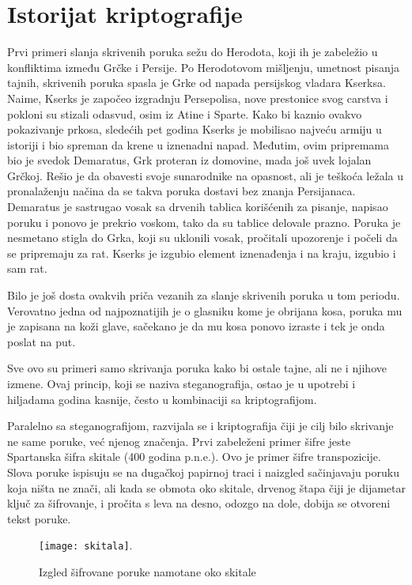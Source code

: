 \documentclass[a4paper]{article}
\begin{document}
\section{Istorijat kriptografije}
\label{sec:istorijat_kriptografije}
Prvi primeri slanja skrivenih poruka sežu do Herodota, koji ih je zabeležio u konfliktima između Grčke i Persije. Po Herodotovom mišljenju, umetnost pisanja tajnih, skrivenih poruka spasla je Grke od napada persijskog vladara Kserksa. Naime, Kserks je započeo izgradnju Persepolisa, nove prestonice svog carstva i pokloni su stizali odasvud, osim iz Atine i Sparte. Kako bi kaznio ovakvo pokazivanje prkosa, sledećih pet godina Kserks je mobilisao najveću armiju u istoriji i bio spreman da krene u iznenadni napad. Međutim, ovim pripremama bio je svedok Demaratus, Grk proteran iz domovine, mada još uvek lojalan Grčkoj. Rešio je da obavesti svoje sunarodnike na opasnost, ali je teškoća ležala u pronalaženju načina da se takva poruka dostavi bez znanja Persijanaca. Demaratus je sastrugao vosak sa drvenih tablica korišćenih za pisanje, napisao poruku i ponovo je prekrio voskom, tako da su tablice delovale prazno. Poruka je nesmetano stigla do Grka, koji su uklonili vosak, pročitali upozorenje i počeli da se pripremaju za rat. Kserks je izgubio element iznenađenja i na kraju, izgubio i sam rat.

Bilo je još dosta ovakvih priča vezanih za slanje skrivenih poruka u tom periodu. Verovatno jedna od najpoznatijih je o glasniku kome je obrijana kosa, poruka mu je zapisana na koži glave, sačekano je da mu kosa ponovo izraste i tek je onda poslat na put.

Sve ovo su primeri samo skrivanja poruka kako bi ostale tajne, ali ne i njihove izmene. Ovaj princip, koji se naziva steganografija, ostao je u upotrebi i hiljadama godina kasnije, često u kombinaciji sa kriptografijom.

Paralelno sa steganografijom, razvijala se i kriptografija čiji je cilj bilo skrivanje ne same poruke, već njenog značenja. Prvi zabeleženi primer šifre jeste Spartanska šifra skitale (400 godina p.n.e.). Ovo je primer šifre transpozicije. Slova poruke ispisuju se na dugačkoj papirnoj traci i naizgled sačinjavaju poruku koja ništa ne znači, ali kada se obmota oko skitale, drvenog štapa čiji je dijametar ključ za
šifrovanje, i pročita s leva na desno, odozgo na dole, dobija se otvoreni tekst poruke.

\begin{figure}[h!]
    \centering
    \texttt{[image: skitala]}.
    \caption{Izgled šifrovane poruke namotane oko skitale}
    \label{fig:skitala}
\end{figure}
\end{document}
